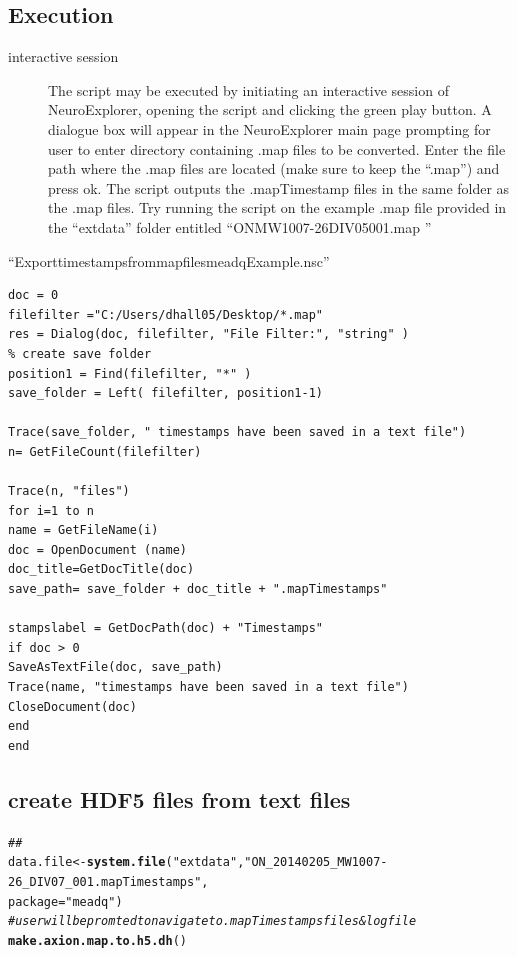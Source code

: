 \documentclass{article}\usepackage[]{graphicx}\usepackage[]{color}
\makeatletter
\newcommand{\hlstr}[1]{\textcolor[rgb]{0.192,0.494,0.8}{#1}}%
\newcommand{\hlcom}[1]{\textcolor[rgb]{0.678,0.584,0.686}{\textit{#1}}}%
\newcommand{\hlstd}[1]{\textcolor[rgb]{0.345,0.345,0.345}{#1}}%
\newcommand{\hlkwb}[1]{\textcolor[rgb]{0.69,0.353,0.396}{#1}}%
\newcommand{\hlkwc}[1]{\textcolor[rgb]{0.333,0.667,0.333}{#1}}%
\newcommand{\hlkwd}[1]{\textcolor[rgb]{0.737,0.353,0.396}{\textbf{#1}}}%
\newenvironment{kframe}{%
 \def\at@end@of@kframe{}%
 \ifinner\ifhmode%
  \def\at@end@of@kframe{\end{minipage}}%
  \begin{minipage}{\columnwidth}%
 \fi\fi%
 \def\FrameCommand##1{\hskip\@totalleftmargin \hskip-\fboxsep
 \colorbox{shadecolor}{##1}\hskip-\fboxsep
     \hskip-\linewidth \hskip-\@totalleftmargin \hskip\columnwidth}%
 \MakeFramed {\advance\hsize-\width
   \@totalleftmargin\z@ \linewidth\hsize
   \@setminipage}}%
 {\par\unskip\endMakeFramed%
 \at@end@of@kframe}
\newenvironment{knitrout}{}{} %
\makeatother
\begin{document}
\subsection*{Execution}
\begin{description}
\item[interactive session] The script may be executed by initiating an interactive session of NeuroExplorer, opening the script and clicking the green play button.  A dialogue box will appear in the NeuroExplorer main page prompting for user to enter directory containing .map files to be converted.  Enter the file path where the .map files are located (make sure to keep the ``.\text{*}map'') and press ok.  The script outputs the .mapTimestamp files in the same folder as the .map files.  Try running the script on the example .map file provided in the ``extdata'' folder entitled ``ON\textunderscore MW1007-26\textunderscore DIV05\textunderscore 001.map ''

\end{description}


``Export\textunderscore timestamps\textunderscore from\textunderscore map\textunderscore files\textunderscore meadqExample.nsc''

\begin{verbatim}
doc = 0
filefilter ="C:/Users/dhall05/Desktop/*.map"
res = Dialog(doc, filefilter, "File Filter:", "string" )
% create save folder
position1 = Find(filefilter, "*" )
save_folder = Left( filefilter, position1-1)

Trace(save_folder, " timestamps have been saved in a text file")
n= GetFileCount(filefilter)

Trace(n, "files")
for i=1 to n
name = GetFileName(i)
doc = OpenDocument (name)
doc_title=GetDocTitle(doc)
save_path= save_folder + doc_title + ".mapTimestamps"

stampslabel = GetDocPath(doc) + "Timestamps"
if doc > 0
SaveAsTextFile(doc, save_path)
Trace(name, "timestamps have been saved in a text file")
CloseDocument(doc)
end
end
\end{verbatim}

\subsection{create HDF5 files from text files}


\begin{knitrout}
\color{fgcolor}\begin{kframe}
\begin{alltt}
\hlcom{## }
\hlstd{data.file} \hlkwb{<-} \hlkwd{system.file}\hlstd{(}\hlstr{"extdata"}\hlstd{,} \hlstr{"ON_20140205_MW1007-26_DIV07_001.mapTimestamps"}\hlstd{,}
    \hlkwc{package} \hlstd{=} \hlstr{"meadq"}\hlstd{)}
\hlcom{# user will be promted to navigate to .mapTimestamps files & log file}
\hlkwd{make.axion.map.to.h5.dh}\hlstd{()}
\end{alltt}
\end{kframe}
\end{knitrout}
\end{document}
